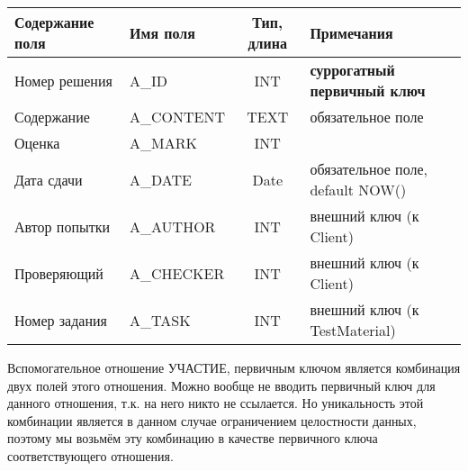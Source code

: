 \documentclass[a4paper,14pt]{article}
\begin{document}
\begin{table}[H]
	\begin{flushleft} 
	\end{flushleft}
\begin{adjustbox}{width=\linewidth}
	\begin{tabular}{|l|l|c|l|}
		\hline
		Содержание поля & Имя поля   & Тип, длина & Примечания                          \\ \hline
		Номер решения   & A\_ID      &    INT    & \textbf{суррогатный первичный ключ} \\ \hline
		Содержание      & A\_CONTENT &    TEXT    & обязательное поле                   \\ \hline
		Оценка          & A\_MARK    &    INT    &                                     \\ \hline
		Дата сдачи      & A\_DATE    &    Date    & обязательное поле, default NOW()    \\ \hline
		Автор попытки   & A\_AUTHOR  &    INT    & внешний ключ (к Client)               \\ \hline
		Проверяющий     & A\_CHECKER &    INT    & внешний ключ (к Client)               \\ \hline
		Номер задания   & A\_TASK    &    INT    & внешний ключ (к TestMaterial)       \\ \hline
	\end{tabular}
\end{adjustbox}
\end{table}


Вспомогательное отношение УЧАСТИЕ, первичным ключом является комбинация двух полей этого отношения. Можно вообще не вводить первичный ключ для данного отношения, т.к. на него никто не ссылается. Но уникальность этой комбинации является в данном случае ограничением целостности данных, поэтому мы возьмём эту комбинацию в качестве первичного ключа соответствующего отношения.
\end{document}
